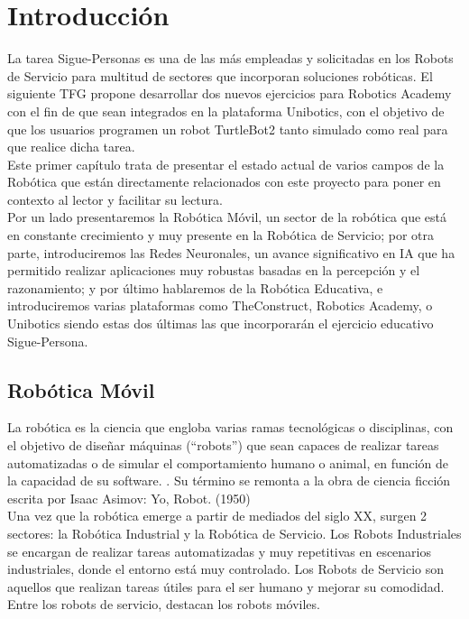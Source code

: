 \chapter{Introducción}
\label{cap:capitulo1}
\setcounter{page}{1}
\pagestyle{plain}

La tarea Sigue-Personas es una de las más empleadas y solicitadas en los Robots de Servicio para multitud de sectores que incorporan soluciones robóticas. El siguiente TFG propone desarrollar dos nuevos ejercicios para Robotics Academy con el fin de que sean integrados en la plataforma Unibotics, con el objetivo de que los usuarios programen un robot TurtleBot2 tanto simulado como real para que realice dicha tarea.\\

Este primer capítulo trata de presentar el estado actual de varios campos de la Robótica que están directamente relacionados con este proyecto para poner en contexto al lector y facilitar su lectura.\\

Por un lado presentaremos la Robótica Móvil, un sector de la robótica que está en constante crecimiento y muy presente en la Robótica de Servicio; por otra parte, introduciremos las Redes Neuronales, un avance significativo en IA que ha permitido realizar aplicaciones muy robustas basadas en la percepción y el razonamiento; y por último hablaremos de la Robótica Educativa, e introduciremos varias plataformas como TheConstruct, Robotics Academy, o Unibotics siendo estas dos últimas las que incorporarán el ejercicio educativo Sigue-Persona.




\section{Robótica Móvil}
\label{sec:robotica_movil}

La robótica es la ciencia que engloba varias ramas tecnológicas o disciplinas, con el objetivo de diseñar máquinas (``robots'') que sean capaces de realizar tareas automatizadas o de simular el comportamiento humano o animal, en función de la capacidad de su software. \cite{revistaderobots}. Su término se remonta a la obra de ciencia ficción escrita por Isaac Asimov: Yo, Robot. (1950)\\

Una vez que la robótica emerge a partir de mediados del siglo XX, surgen 2 sectores: la Robótica Industrial y la Robótica de Servicio. Los Robots Industriales se encargan de realizar tareas automatizadas y muy repetitivas en escenarios industriales, donde el entorno está muy controlado. Los Robots de Servicio son aquellos que realizan tareas útiles para el ser humano y mejorar su comodidad. Entre los robots de servicio, destacan los robots móviles.\\

